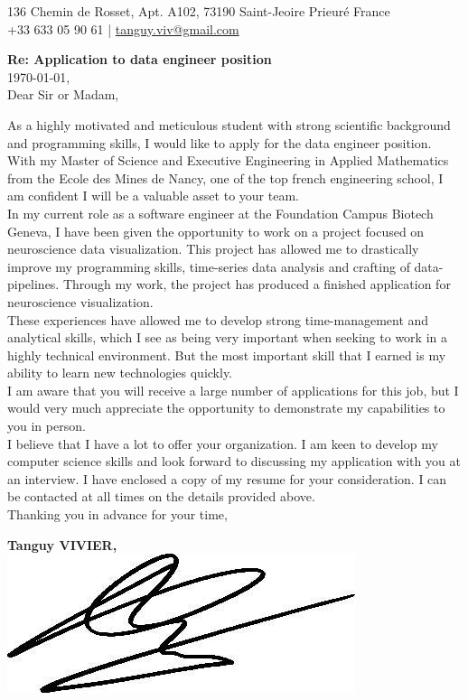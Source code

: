 \documentclass[]{cv-style}          %
\begin{document}
\huge
{}
\vspace{-0.9cm}
%
\begin{center}
    \large
    136 Chemin de Rosset, Apt. A102, 73190 Saint-Jeoire Prieuré France \\
    +33 633 05 90 61 | \href{tanguy.viv@gmail.com}{tanguy.viv@gmail.com}
\end{center}
%
\vspace{1.5cm}
\begin{flushleft}
    \large
    \textbf{Re: Application to data engineer position}\\[0.2cm]
    \today, \\[1cm]
    Dear Sir or Madam,
\end{flushleft}
\vspace{0.4cm}
\large
As a highly motivated and meticulous student with strong scientific background
and programming skills, I would like to apply for the data engineer position.
With my Master of Science and Executive Engineering in Applied Mathematics
from the Ecole des Mines de Nancy, one of the top french engineering school,
I am confident I will be a valuable asset to your team. \\[0.5cm]
%
In my current role as a software engineer at the Foundation Campus Biotech
Geneva, I have been given the opportunity to work on a project focused on
neuroscience data visualization. This project has allowed me to drastically
improve my programming skills, time-series data analysis and crafting of
data-pipelines. Through my work, the project has produced a finished
application for neuroscience visualization. \\[0.5cm]
%
These experiences have allowed me to develop strong time-management and
analytical skills, which I see as being very important when seeking to work
in a highly technical environment. But the most important skill that I earned
is my ability to learn new technologies quickly. \\[0.5cm]
%
I am aware that you will receive a large number of applications for this job,
but I would very much appreciate the opportunity to demonstrate my capabilities
to you in person. \\[0.5cm]
%
I believe that I have a lot to offer your organization. I am keen to develop
my computer science skills and look forward to discussing my application with
you at an interview. I have enclosed a copy of my resume for your
consideration. I can be contacted at all times on the details provided above.
\\[0.5cm]
%
Thanking you in advance for your time, \\[0.5cm]
%
\begin{flushright}
\parbox{5cm}{
\centering
    \textbf{Tanguy VIVIER,}\\
    \hspace{2cm}\includegraphics[scale=0.4]{signature.jpg}
}
\end{flushright}
\end{document}

